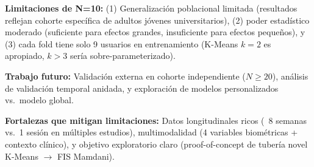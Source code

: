 \textbf{Limitaciones de N=10:} (1) Generalización poblacional limitada (resultados reflejan cohorte específica de adultos jóvenes universitarios), (2) poder estadístico moderado (suficiente para efectos grandes, insuficiente para efectos pequeños), y (3) cada fold tiene solo 9 usuarios en entrenamiento (K-Means $k=2$ es apropiado, $k > 3$ sería sobre-parameterizado).

\textbf{Trabajo futuro:} Validación externa en cohorte independiente ($N \geq 20$), análisis de validación temporal anidada, y exploración de modelos personalizados vs.\ modelo global.

\textbf{Fortalezas que mitigan limitaciones:} Datos longitudinales ricos (~8 semanas vs.\ 1 sesión en múltiples estudios), multimodalidad (4 variables biométricas + contexto clínico), y objetivo exploratorio claro (proof-of-concept de tubería novel K-Means $\rightarrow$ FIS Mamdani).